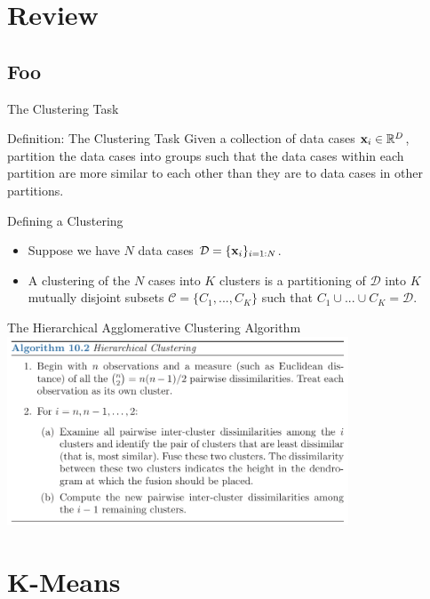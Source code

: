 \documentclass[serif,xcolor=pdftex,dvipsnames,table,hyperref={bookmarks=false,breaklinks}]{beamer}
\begin{document}
\maketitlepage

\section{Review}
\subsection{Foo}


\begin{frame}[t]{The Clustering Task}
\begin{block}{Definition: The Clustering Task}
Given a collection of data cases ${\mathbf{x}}_i\in\mathbb{R}^D$, partition the 
data cases into groups such that the data cases within each partition are
more similar to each other than they are to data cases in other partitions.
\end{block}
\end{frame}
 
 
\begin{frame}[t]{Defining a Clustering}
 
\begin{itemize}
\item Suppose we have $N$ data cases $\mathcal{D}=\{{\mathbf{x}}_i\}_{i=1:N}$.
 
\item A clustering of the $N$ cases into $K$ clusters is a partitioning 
 of $\mathcal{D}$ into $K$ mutually disjoint subsets 
 $\mathcal{C}=\{C_1,...,C_K\}$ such that 
 $C_1 \cup ... \cup C_K = \mathcal{D}$.
 
\end{itemize} 
\end{frame}

\begin{frame}[t]{The Hierarchical Agglomerative Clustering Algorithm}
\center
\includegraphics[width=4in]{../Figures/hac_algorithm.png}
\end{frame}


\section{K-Means}
\end{document}
